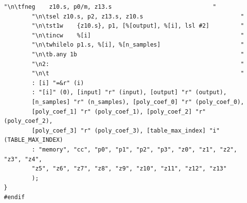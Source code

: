 \documentclass[11pt,a4paper,twoside,english]{extarticle}
\begin{document}
\begin{lstfloat}[H]
\begin{lstlisting}[style=C, captionpos=b, caption={Piecewise polynomial approximation implementations using \arm SVE inline assembly.}, label={code:c:piecewise_polynomial_approximation_use_arm_sve_inline_approx_cubic}]
        "\n\tfneg    z10.s, p0/m, z13.s                             "
        "\n\tsel z10.s, p2, z13.s, z10.s                            "
        "\n\tst1w    {z10.s}, p1, [%[output], %[i], lsl #2]         "
        "\n\tincw    %[i]                                           "
        "\n\twhilelo p1.s, %[i], %[n_samples]                       "
        "\n\tb.any 1b                                               "
        "\n2:                                                       "
        "\n\t                                                       "
        : [i] "=&r" (i) 
        : "[i]" (0), [input] "r" (input), [output] "r" (output),
        [n_samples] "r" (n_samples), [poly_coef_0] "r" (poly_coef_0),
        [poly_coef_1] "r" (poly_coef_1), [poly_coef_2] "r" (poly_coef_2),
        [poly_coef_3] "r" (poly_coef_3), [table_max_index] "i" (TABLE_MAX_INDEX)
        : "memory", "cc", "p0", "p1", "p2", "p3", "z0", "z1", "z2", "z3", "z4",
        "z5", "z6", "z7", "z8", "z9", "z10", "z11", "z12", "z13"
        );
}
#endif
\end{lstlisting}
\end{lstfloat}
\end{document}
